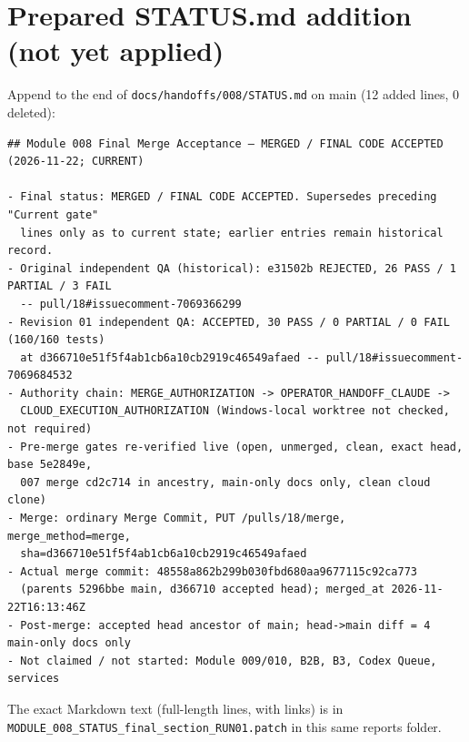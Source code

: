 \documentclass[11pt,a4paper]{article}
\begin{document}
\appendix
\section{Prepared STATUS.md addition (not yet applied)}\label{app:patch}
Append to the end of \texttt{docs/handoffs/008/STATUS.md} on main (12 added lines, 0 deleted):
\begin{Verbatim}[fontsize=\scriptsize]
## Module 008 Final Merge Acceptance — MERGED / FINAL CODE ACCEPTED (2026-11-22; CURRENT)

- Final status: MERGED / FINAL CODE ACCEPTED. Supersedes preceding "Current gate"
  lines only as to current state; earlier entries remain historical record.
- Original independent QA (historical): e31502b REJECTED, 26 PASS / 1 PARTIAL / 3 FAIL
  -- pull/18#issuecomment-7069366299
- Revision 01 independent QA: ACCEPTED, 30 PASS / 0 PARTIAL / 0 FAIL (160/160 tests)
  at d366710e51f5f4ab1cb6a10cb2919c46549afaed -- pull/18#issuecomment-7069684532
- Authority chain: MERGE_AUTHORIZATION -> OPERATOR_HANDOFF_CLAUDE ->
  CLOUD_EXECUTION_AUTHORIZATION (Windows-local worktree not checked, not required)
- Pre-merge gates re-verified live (open, unmerged, clean, exact head, base 5e2849e,
  007 merge cd2c714 in ancestry, main-only docs only, clean cloud clone)
- Merge: ordinary Merge Commit, PUT /pulls/18/merge, merge_method=merge,
  sha=d366710e51f5f4ab1cb6a10cb2919c46549afaed
- Actual merge commit: 48558a862b299b030fbd680aa9677115c92ca773
  (parents 5296bbe main, d366710 accepted head); merged_at 2026-11-22T16:13:46Z
- Post-merge: accepted head ancestor of main; head->main diff = 4 main-only docs only
- Not claimed / not started: Module 009/010, B2B, B3, Codex Queue, services
\end{Verbatim}
The exact Markdown text (full-length lines, with links) is in
\texttt{MODULE\_008\_STATUS\_final\_section\_RUN01.patch} in this same reports folder.
\end{document}
